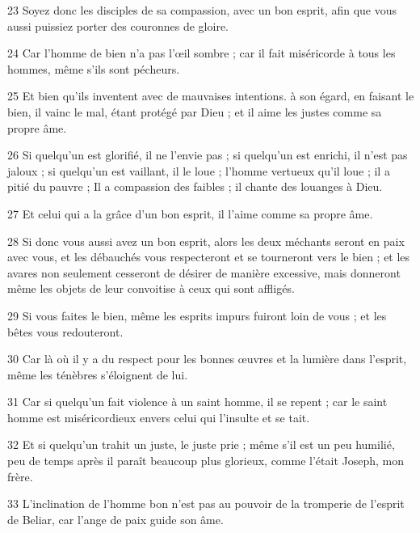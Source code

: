 \par 23 Soyez donc les disciples de sa compassion, avec un bon esprit, afin que vous aussi puissiez porter des couronnes de gloire.

\par 24 Car l'homme de bien n'a pas l'œil sombre ; car il fait miséricorde à tous les hommes, même s'ils sont pécheurs.

\par 25 Et bien qu'ils inventent avec de mauvaises intentions. à son égard, en faisant le bien, il vainc le mal, étant protégé par Dieu ; et il aime les justes comme sa propre âme.

\par 26 Si quelqu'un est glorifié, il ne l'envie pas ; si quelqu'un est enrichi, il n'est pas jaloux ; si quelqu'un est vaillant, il le loue ; l'homme vertueux qu'il loue ; il a pitié du pauvre ; Il a compassion des faibles ; il chante des louanges à Dieu.

\par 27 Et celui qui a la grâce d'un bon esprit, il l'aime comme sa propre âme.

\par 28 Si donc vous aussi avez un bon esprit, alors les deux méchants seront en paix avec vous, et les débauchés vous respecteront et se tourneront vers le bien ; et les avares non seulement cesseront de désirer de manière excessive, mais donneront même les objets de leur convoitise à ceux qui sont affligés.

\par 29 Si vous faites le bien, même les esprits impurs fuiront loin de vous ; et les bêtes vous redouteront.

\par 30 Car là où il y a du respect pour les bonnes œuvres et la lumière dans l'esprit, même les ténèbres s'éloignent de lui.

\par 31 Car si quelqu'un fait violence à un saint homme, il se repent ; car le saint homme est miséricordieux envers celui qui l'insulte et se tait.

\par 32 Et si quelqu'un trahit un juste, le juste prie ; même s'il est un peu humilié, peu de temps après il paraît beaucoup plus glorieux, comme l'était Joseph, mon frère.

\par 33 L'inclination de l'homme bon n'est pas au pouvoir de la tromperie de l'esprit de Beliar, car l'ange de paix guide son âme.

